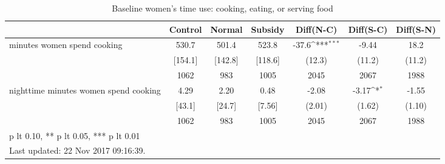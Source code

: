 \begin{table}[htbp]\centering
\def\sym#1{\ifmmode^{#1}\else\(^{#1}\)\fi}
\caption{Baseline women's time use: cooking, eating, or serving food \label{tab:"balance"}}
\begin{tabular*}{1\hsize}{@{\hskip\tabcolsep\extracolsep\fill}l*{1}{cccccc}}
\toprule
                                &  Control&   Normal&  Subsidy&Diff(N-C)         &Diff(S-C)         &Diff(S-N)         \\
\midrule
minutes women spend cooking     &    530.7&    501.4&    523.8&    -37.6\sym{***}&    -9.44         &     18.2         \\
                                &  [154.1]&  [142.8]&  [118.6]&   (12.3)         &   (11.2)         &   (11.2)         \\
                                &     1062&      983&     1005&     2045         &     2067         &     1988         \\
nighttime minutes women spend cooking&     4.29&     2.20&     0.48&    -2.08         &    -3.17\sym{*}  &    -1.55         \\
                                &   [43.1]&   [24.7]&   [7.56]&   (2.01)         &   (1.62)         &   (1.10)         \\
                                &     1062&      983&     1005&     2045         &     2067         &     1988         \\
\bottomrule
\multicolumn{7}{l}{\footnotesize * p lt 0.10, ** p lt 0.05, *** p lt 0.01}\\
\multicolumn{7}{l}{\footnotesize Last updated: 22 Nov 2017 09:16:39.}\\
\end{tabular*}
\end{table}
